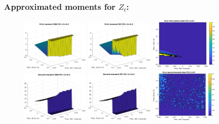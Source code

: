 \documentclass[aspectratio=169]{beamer}\usepackage[utf8]{inputenc}
\begin{document}
\begin{frame}\frametitle{Approximated moments for $Z_t$:}

\begin{figure}[ht!]
\centering
\includegraphics[width=0.3\textwidth]{../../MATLAB_Files/Results/moments/lamperti/errors/fm_ODE_1.eps}\quad
\includegraphics[width=0.3\textwidth]{../../MATLAB_Files/Results/moments/lamperti/errors/fm_MC_1.eps}\quad
\includegraphics[width=0.3\textwidth]{../../MATLAB_Files/Results/moments/lamperti/errors/fm_1.eps}\quad
\includegraphics[width=0.3\textwidth]{../../MATLAB_Files/Results/moments/lamperti/errors/sm_ODE_1.eps}\quad
\includegraphics[width=0.3\textwidth]{../../MATLAB_Files/Results/moments/lamperti/errors/sm_MC_1.eps}\quad
\includegraphics[width=0.3\textwidth]{../../MATLAB_Files/Results/moments/lamperti/errors/sm_1.eps}
\end{figure}

\end{frame}
\end{document}
